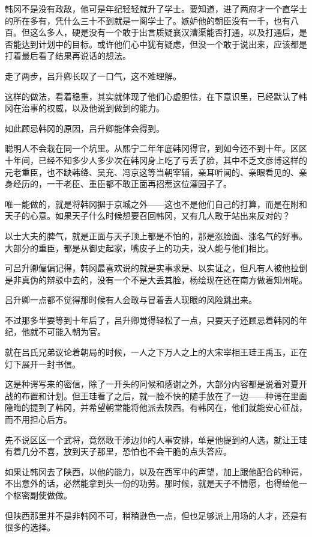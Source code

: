 韩冈不是没有政敌，他可是年纪轻轻就升了学士。要知道，进了两府才一个直学士的所在多有，凭什么三十不到就是一阁学士了。嫉妒他的朝臣没有一千，也有八百。但这么多人，硬是没有一个敢于出言质疑襄汉漕渠能否打通，以及打通后，是否能达到计划中的目标。或许他们心中犹有疑虑，但没一个敢于说出来，应该都是打着最后看了结果再说话的想法。

走了两步，吕升卿长叹了一口气，这不难理解。

这样的做法，看着稳重，其实就体现了他们心虚胆怯，在下意识里，已经默认了韩冈在治事的权威，以及他说到做到的能力。

如此顾忌韩冈的原因，吕升卿能体会得到。

聪明人不会栽在同一个坑里。从熙宁二年年底韩冈得官，到如今还不到十年。区区十年间，已经不知多少人多少次在韩冈身上吃了亏丢了脸，其中不乏文彦博这样的元老重臣，也不缺韩绛、吴充、冯京这等当朝宰辅，亲耳听闻的、亲眼看见的、亲身经历的，一干老臣、重臣都不敢正面再招惹这位灌园子了。

唯一能做的，就是将韩冈摒于京城之外——这也不是他们自己的打算，而是在附和天子的心意。如果天子什么时候想要召回韩冈，又有几人敢于站出来反对的？

以士大夫的脾气，就是正面与天子顶上都是不怕的，那是涨脸面、涨名气的好事。大部分的重臣，都是从御史起家，嘴皮子上的功夫，没人能与他们相比。

可吕升卿偏偏记得，韩冈最喜欢说的就是实事求是、以实证之，但凡有人被他拉倒是非真伪的辩驳中去的，没有一个不是大丢其脸，杨绘现在还在南方做着知州呢。

吕升卿一点都不觉得那时候有人会敢与冒着丢人现眼的风险跳出来。

不过那多半要等到十年后了，吕升卿觉得轻松了一点，只要天子还顾忌着韩冈的年纪，他就不可能入朝为官。

就在吕氏兄弟议论着朝局的时候，一人之下万人之上的大宋宰相王珪王禹玉，正在灯下展开一封书信。

这是种谔写来的密信，除了一开头的问候和感谢之外，大部分内容都是说着对夏开战的布置和计划。但王珪看了之后，就一脸不快的随手放在了一边——种谔在里面隐晦的提到了韩冈，并希望朝堂能将他派去陕西。有韩冈在，他们就能安心征战，而不用担心后方。

先不说区区一个武将，竟然敢干涉边帅的人事安排，单是他提到的人选，就让王珪有着几分不喜，放到天子那里，恐怕也不会干脆的点头答应。

如果让韩冈去了陕西，以他的能力，以及在西军中的声望，加上跟他配合的种谔，不出意外的话，必然能拿到头一份的功劳。那时候，就是天子不情愿，也得给他一个枢密副使做做。

但陕西那里并不是非韩冈不可，稍稍逊色一点，但也足够派上用场的人才，还是有很多的选择。

